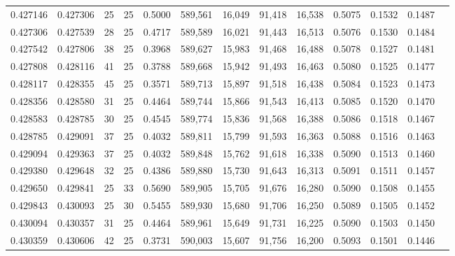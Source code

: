 \begin{tabular}{rrrrrrrrrrrrr}
0.427146 & 0.427306 &    25 &  25 &                                     0.5000 & 589,561 &  16,049 &  91,418 &  16,538 & 0.5075 & 0.1532 & 0.1487 \\
0.427306 & 0.427539 &    28 &  25 &                                     0.4717 & 589,589 &  16,021 &  91,443 &  16,513 & 0.5076 & 0.1530 & 0.1484 \\
0.427542 & 0.427806 &    38 &  25 &                                     0.3968 & 589,627 &  15,983 &  91,468 &  16,488 & 0.5078 & 0.1527 & 0.1481 \\
0.427808 & 0.428116 &    41 &  25 &                                     0.3788 & 589,668 &  15,942 &  91,493 &  16,463 & 0.5080 & 0.1525 & 0.1477 \\
0.428117 & 0.428355 &    45 &  25 &                                     0.3571 & 589,713 &  15,897 &  91,518 &  16,438 & 0.5084 & 0.1523 & 0.1473 \\
0.428356 & 0.428580 &    31 &  25 &                                     0.4464 & 589,744 &  15,866 &  91,543 &  16,413 & 0.5085 & 0.1520 & 0.1470 \\
0.428583 & 0.428785 &    30 &  25 &                                     0.4545 & 589,774 &  15,836 &  91,568 &  16,388 & 0.5086 & 0.1518 & 0.1467 \\
0.428785 & 0.429091 &    37 &  25 &                                     0.4032 & 589,811 &  15,799 &  91,593 &  16,363 & 0.5088 & 0.1516 & 0.1463 \\
0.429094 & 0.429363 &    37 &  25 &                                     0.4032 & 589,848 &  15,762 &  91,618 &  16,338 & 0.5090 & 0.1513 & 0.1460 \\
0.429380 & 0.429648 &    32 &  25 &                                     0.4386 & 589,880 &  15,730 &  91,643 &  16,313 & 0.5091 & 0.1511 & 0.1457 \\
0.429650 & 0.429841 &    25 &  33 &                                     0.5690 & 589,905 &  15,705 &  91,676 &  16,280 & 0.5090 & 0.1508 & 0.1455 \\
0.429843 & 0.430093 &    25 &  30 &                                     0.5455 & 589,930 &  15,680 &  91,706 &  16,250 & 0.5089 & 0.1505 & 0.1452 \\
0.430094 & 0.430357 &    31 &  25 &                                     0.4464 & 589,961 &  15,649 &  91,731 &  16,225 & 0.5090 & 0.1503 & 0.1450 \\
0.430359 & 0.430606 &    42 &  25 &                                     0.3731 & 590,003 &  15,607 &  91,756 &  16,200 & 0.5093 & 0.1501 & 0.1446 \\

\end{tabular}
